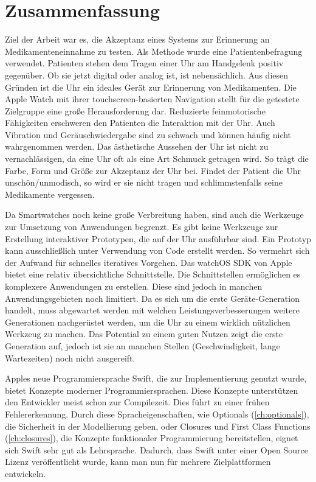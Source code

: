 \section{Zusammenfassung}
Ziel der Arbeit war es, die Akzeptanz eines Systems zur Erinnerung an Medikamenteneinnahme zu testen. Als Methode wurde eine Patientenbefragung verwendet. Patienten stehen dem Tragen einer Uhr am Handgelenk positiv gegenüber. Ob sie jetzt digital oder analog ist, ist nebensächlich. Aus diesen Gründen ist die Uhr ein ideales Gerät zur Erinnerung von Medikamenten. Die Apple Watch mit ihrer touchscreen-basierten Navigation stellt für die getestete Zielgruppe eine große Herausforderung dar. Reduzierte feinmotorische Fähigkeiten erschweren den Patienten die Interaktion mit der Uhr. Auch Vibration und Geräuschwiedergabe sind zu schwach und können häufig nicht wahrgenommen werden. Das ästhetische Aussehen der Uhr ist nicht zu vernachlässigen, da eine Uhr oft als eine Art Schmuck getragen wird. So trägt die Farbe, Form und Größe zur Akzeptanz der Uhr bei. Findet der Patient die Uhr unschön/unmodisch, so wird er sie nicht tragen und schlimmstenfalls seine Medikamente vergessen.

Da Smartwatches noch keine große Verbreitung haben, sind auch die Werkzeuge zur Umsetzung von Anwendungen begrenzt. Es gibt keine Werkzeuge zur Erstellung interaktiver Prototypen, die auf der Uhr ausführbar sind. Ein Prototyp kann ausschließlich unter Verwendung von Code erstellt werden. So vermehrt sich der Aufwand für schnelles iteratives Vorgehen. Das watchOS SDK von Apple bietet eine relativ übersichtliche Schnittstelle. Die Schnittstellen ermöglichen es komplexere Anwendungen zu erstellen. Diese sind jedoch in manchen Anwendungsgebieten noch limitiert. Da es sich um die erste Geräte-Generation handelt, muss abgewartet werden mit welchen Leistungsverbesserungen weitere Generationen nachgerüstet werden, um die Uhr zu einem wirklich nützlichen Werkzeug zu machen. Das Potential zu einem guten Nutzen zeigt die erste Generation auf, jedoch ist sie an manchen Stellen (Geschwindigkeit, lange Wartezeiten) noch nicht ausgereift.

Apples neue Programmiersprache Swift, die zur Implementierung genutzt wurde, bietet Konzepte moderner Programmiersprachen. Diese Konzepte unterstützen den Entwickler meist schon zur Compilezeit. Dies führt zu einer frühen Fehlererkennung. Durch diese Spracheigenschaften, wie Optionals (\ref{ch:optionals}), die Sicherheit in der Modellierung geben, oder Closures und First Class Functions (\ref{ch:closures}), die Konzepte funktionaler Programmierung bereitstellen, eignet sich Swift sehr gut als Lehrsprache. Dadurch, dass Swift unter einer Open Source Lizenz veröffentlicht wurde, kann man nun für mehrere Zielplattformen entwickeln.

